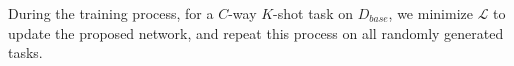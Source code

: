 \documentclass[letterpaper]{article} %
\begin{document}
During the training process, for a $C$-way $K$-shot task on $D_{base}$, we minimize $\mathcal{L}$ to update the proposed network, and repeat this process on all randomly generated tasks.






\end{document}
